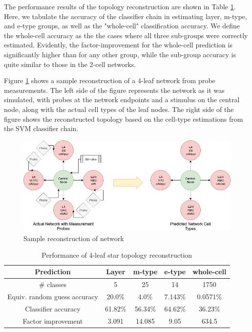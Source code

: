 \par
The performance results of the topology reconstruction are shown in Table \ref{tbl:wholeClassifierPerf}. Here, we tabulate the accuracy of the classifier chain in estimating layer, m-type, and e-type groups, as well as the "whole-cell" classification accuracy. We define the whole-cell accuracy as the the cases where all three sub-groups were correctly estimated. Evidently, the factor-improvement for the whole-cell prediction is significantly higher than for any other group, while the sub-group accuracy is quite similar to those in the 2-cell networks.

\par

Figure \ref{fig:4CellRecon} shows a sample reconstruction of a 4-leaf network from probe measurements. The left side of the figure represents the network as it was simulated, with probes at the network endpoints and a stimulus on the central node, along with the actual cell types of the leaf nodes. The right side of the figure shows the reconstructed topology based on the cell-type estimations from the SVM classifier chain. 

\begin{figure}[ht]
    \centering
    \includegraphics[width=1.0\textwidth]{05-Results/4cellTopRecon.png}
    \caption{Sample reconstruction of network}
    \label{fig:4CellRecon}
\end{figure}

\begin{table}[ht]
    \centering
    \begin{tabular}{|c||c|c|c|c|}
        \hline
        Prediction & Layer & m-type & e-type & whole-cell \\
        \hline\hline
        \# classes & 5 & 25 & 14 & 1750\\
        \hline
        Equiv. random guess accuracy & 20.0\% & 4.0\% & 7.143\% & 0.0571\%\\
        \hline
        Classifier accuracy & 61.82\% & 56.34\% & 64.62\% & 36.23\%\\
        \hline
        Factor improvement & 3.091 & 14.085 & 9.05 & 634.5\\
        \hline
    \end{tabular}
    \caption{Performance of 4-leaf star topology reconstruction}
    \label{tbl:wholeClassifierPerf}
\end{table}


